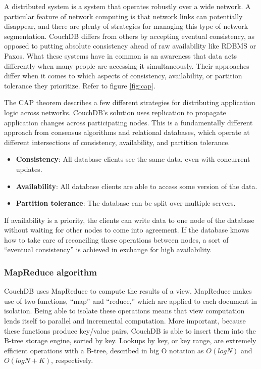 A distributed system is a system that operates robustly over a wide network. 
A particular feature of network computing is that network links can potentially 
disappear, and there are plenty of strategies for managing this type of network 
segmentation. CouchDB differs from others by accepting eventual consistency, 
as opposed to putting absolute consistency ahead of raw availability like 
RDBMS or Paxos. What these systems have in common is an awareness that data 
acts differently when many people are accessing it simultaneously. 
Their approaches differ when it comes to which aspects of consistency, 
availability, or partition tolerance they prioritize. Refer to figure \ref{fig:cap}.

The CAP theorem describes a few different strategies for distributing application 
logic across networks. CouchDB’s solution uses replication to propagate application 
changes across participating nodes. This is a fundamentally different approach from 
consensus algorithms and relational databases, which operate at different intersections 
of consistency, availability, and partition tolerance.

\begin{itemize}
    \item \textbf{Consistency}: All database clients see the same data, even with concurrent updates.
    \item \textbf{Availability}: All database clients are able to access some version of the data.
    \item \textbf{Partition tolerance}: The database can be split over multiple servers.
\end{itemize}

If availability is a priority, the clients can write data to one node of the 
database without waiting for other nodes to come into agreement. If the database 
knows how to take care of reconciling these operations between nodes, 
a sort of “eventual consistency” is achieved in exchange for high availability.

\subsubsection{MapReduce algorithm}

CouchDB uses MapReduce to compute the results of a view. MapReduce makes use of two 
functions, “map” and “reduce,” which are applied to each document in isolation. 
Being able to isolate these operations means that view computation lends itself 
to parallel and incremental computation. More important, because these functions 
produce key/value pairs, CouchDB is able to insert them into the B-tree storage engine, 
sorted by key. Lookups by key, or key range, are extremely efficient operations with a 
B-tree, described in big O notation as $O(log N)$ and $O(log N + K)$, respectively.~\cite{CouchDB}
